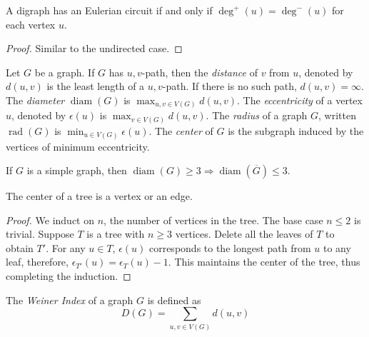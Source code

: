 \begin{theorem}
    A digraph has an Eulerian circuit if and only if $\deg^+(u) = \deg^-(u)$ for each vertex $u$.
\end{theorem}
\begin{proof}
    Similar to the undirected case.
\end{proof}

\begin{definition}
    Let $G$ be a graph. If $G$ has $u,v$-path, then the \textit{distance} of $v$ from $u$, denoted by $d(u,v)$ is the least length of a $u,v$-path. If there is no such path, $d(u, v)=\infty$. The \textit{diameter} $\operatorname{diam}(G)$ is $\max_{u,v\in V(G)}d(u,v)$. The \textit{eccentricity} of a vertex $u$, denoted by $\epsilon(u)$ is $\max_{v\in V(G)}d(u,v)$. The \textit{radius} of a graph $G$, written $\operatorname{rad}(G)$ is $\min_{u\in V(G)}\epsilon(u)$. The \textit{center} of $G$ is the subgraph induced by the vertices of minimum eccentricity.
\end{definition}

\begin{proposition}
    If $G$ is a simple graph, then $\operatorname{diam}(G)\ge 3\Longrightarrow\operatorname{diam}(\overline{G})\le 3$.
\end{proposition}

\begin{theorem}[Jordan, 1869]
    The center of a tree is a vertex or an edge.
\end{theorem}
\begin{proof}
    We induct on $n$, the number of vertices in the tree. The base case $n\le 2$ is trivial. Suppose $T$ is a tree with $n \ge 3$ vertices. Delete all the leaves of $T$ to obtain $T'$. For any $u\in T$, $\epsilon(u)$ corresponds to the longest path from $u$ to any leaf, therefore, $\epsilon_{T'}(u) = \epsilon_T(u) - 1$. This maintains the center of the tree, thus completing the induction.
\end{proof}

\begin{definition}
    The \textit{Weiner Index} of a graph $G$ is defined as 
    \begin{equation*}
        D(G) = \sum_{u,v\in V(G)}d(u, v)
    \end{equation*}
\end{definition}

